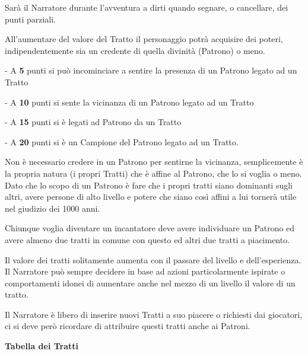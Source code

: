 \documentclass[a4paper,11pt,twoside,openany]{book}
\begin{document}
Sarà il Narratore durante l'avventura a dirti quando segnare, o cancellare, dei punti parziali.

All'aumentare del valore del Tratto il personaggio potrà acquisire dei poteri, indipendentemente sia un credente di quella divinità (Patrono) o meno.

- A \textbf{5} punti si può incominciare a sentire la presenza di un Patrono legato ad un Tratto

- A \textbf{10} punti si sente la vicinanza di un Patrono legato ad un Tratto

- A \textbf{15}  punti si è legati ad Patrono da un Tratto

- A \textbf{20} punti si è un Campione del Patrono legato ad un Tratto.


Non è necessario credere in un Patrono per sentirne la vicinanza, semplicemente è la propria natura (i propri Tratti) che è affine al Patrono, che lo si voglia o meno.
Dato che lo scopo di un Patrono è fare che i propri tratti siano dominanti sugli altri, avere persone di alto livello e potere che siano così affini a lui tornerà utile nel giudizio dei   1000 anni.

Chiunque voglia diventare un incantatore deve avere individuare un Patrono ed avere almeno due tratti in comune con questo ed altri due tratti a piacimento.

\smallskip

Il valore dei tratti solitamente aumenta con il passare del livello e dell'esperienza. Il Narratore può sempre decidere in base ad azioni particolarmente ispirate o comportamenti idonei di aumentare anche nel mezzo di un livello il valore di un tratto.

Il Narratore è libero di inserire nuovi Tratti a suo piacere o richiesti dai giocatori, ci si deve però ricordare di attribuire questi tratti anche ai Patroni.

\bigskip

\pagebreak

\textbf{Tabella dei Tratti}

\bigskip
\end{document}
